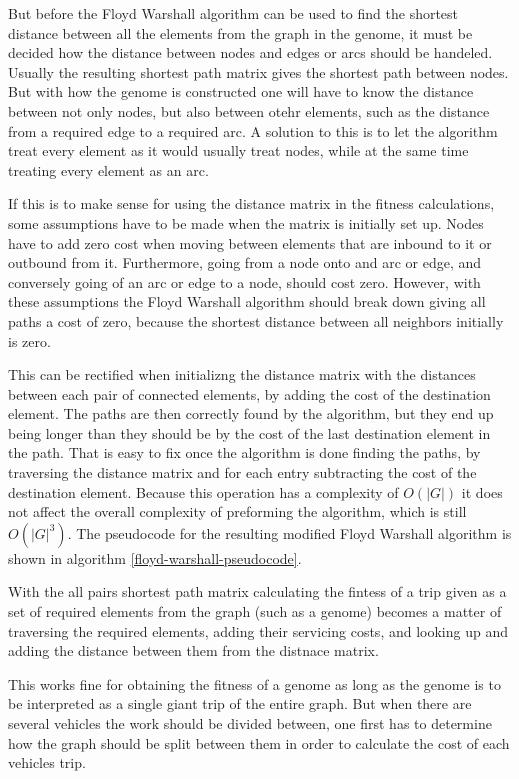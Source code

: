 But before the Floyd Warshall algorithm can be used to find the shortest distance between all the elements from the graph in the genome, it must be decided how the distance between nodes and edges or arcs should be handeled. Usually the resulting shortest path matrix gives the shortest path between nodes. But with how the genome is constructed one will have to know the distance between not only nodes, but also between otehr elements, such as the distance from a required edge to a required arc. A solution to this is to let the algorithm treat every element as it would usually treat nodes, while at the same time treating every element as an arc.

If this is to make sense for using the distance matrix in the fitness calculations, some assumptions have to be made when the matrix is initially set up. Nodes have to add zero cost when moving between elements that are inbound to it or outbound from it. Furthermore, going from a node onto and arc or edge, and conversely going of an arc or edge to a node, should cost zero. However, with these assumptions the Floyd Warshall algorithm should break down giving all paths a cost of zero, because the shortest distance between all neighbors initially is zero.

This can be rectified when initializng the distance matrix with the distances between each pair of connected elements, by adding the cost of the destination element. The paths are then correctly found by the algorithm, but they end up being longer than they should be by the cost of the last destination element in the path. That is easy to fix once the algorithm is done finding the paths, by traversing the distance matrix and for each entry subtracting the cost of the destination element. Because this operation has a complexity of $O(|G|)$ it does not affect the overall complexity of preforming the algorithm, which is still $O(|G|^3)$. The pseudocode for the resulting modified Floyd Warshall algorithm is shown in algorithm \ref{floyd-warshall-pseudocode}.



With the all pairs shortest path matrix calculating the fintess of a trip given as a set of required elements from the graph (such as a genome) becomes a matter of traversing the required elements, adding their servicing costs, and looking up and adding the distance between them from the distnace matrix.

This works fine for obtaining the fitness of a genome as long as the genome is to be interpreted as a single giant trip of the entire graph. But when there are several vehicles the work should be divided between, one first has to determine how the graph should be split between them in order to calculate the cost of each vehicles trip.

